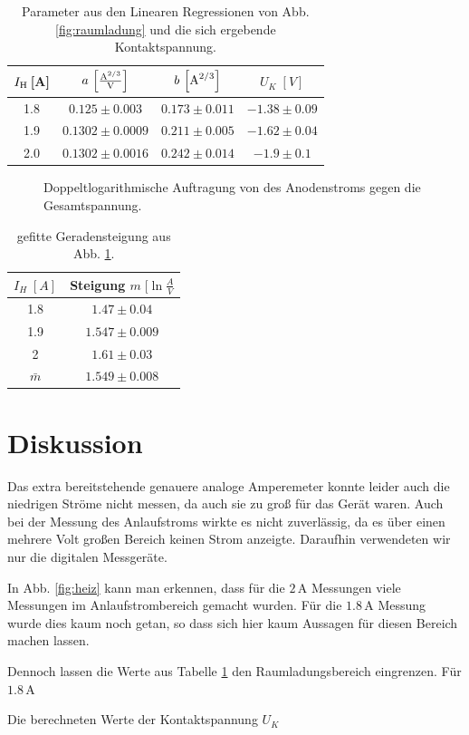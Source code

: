 \documentclass[12pt,a4paper,titlepage,headinclude,bibtotoc]{scrartcl}
\begin{document}
\begin{table}[!h]
\centering
\begin{tabular}{|c|c|c|c|}
\hline
$I_\text H\,$[A]& $a\,\left[\frac{\text A^{2/3}}{\text V}\right]$	& $b\,\left[\text A^{2/3}\right]$ & $U_K \; [V]$	\\\hline\hline
1.8 		& $0.125\pm 0.003$	& $0.173\pm 0.011$		&$-1.38 \pm 0.09$	\\\hline
1.9 		& $0.1302\pm0.0009$ 	& $0.211\pm 0.005$		&$-1.62 \pm 0.04$	\\\hline
2.0 		& $0.1302\pm 0.0016$	& $0.242 \pm 0.014$		&$-1.9 \pm 0.1	$	\\\hline
\end{tabular}
\caption{Parameter aus den Linearen Regressionen von Abb. \ref{fig:raumladung} und die sich ergebende Kontaktspannung.}
\label{tab:ParaRaum}
\end{table}


\begin{figure}[!h]
\centering

\caption{Doppeltlogarithmische Auftragung von des Anodenstroms gegen die Gesamtspannung.}
\label{fig:expRauml}
\end{figure}

\begin{table}
\centering
\begin{tabular}{|c|c|}
\hline
$I_H\; [A]$	& Steigung $m\;[\ln\frac{A}{V}$\\\hline\hline
1.8	& $1.47 \pm 0.04$	\\\hline
1.9	& $1.547 \pm 0.009$	\\\hline
2	& $1.61 \pm 0.03$	\\\hline\hline
$\bar{m}$ & $1.549 \pm 0.008$\\\hline
\end{tabular}
\caption{gefitte Geradensteigung aus Abb. \ref{fig:expRauml}.}
\label{tab:expPara}
\end{table}

\section{Diskussion}
\label{sec:diskussion}
Das extra bereitstehende genauere analoge Amperemeter konnte leider auch die niedrigen Ströme nicht messen, da auch sie zu groß für das Gerät waren.
Auch bei der Messung des Anlaufstroms wirkte es nicht zuverlässig, da es über einen mehrere Volt großen Bereich keinen Strom anzeigte.
Daraufhin verwendeten wir nur die digitalen Messgeräte.

In Abb. \ref{fig:heiz} kann man erkennen, dass für die $2\,$A Messungen viele Messungen im Anlaufstrombereich gemacht wurden.
Für die $1.8\,$A Messung wurde dies kaum noch getan, so dass sich hier kaum Aussagen für diesen Bereich machen lassen.

Dennoch lassen die Werte aus Tabelle \ref{tab:ParaRaum} den Raumladungsbereich eingrenzen.
Für $1.8\,$A 


Die berechneten Werte der Kontaktspannung $U_K$ 



\end{document}
